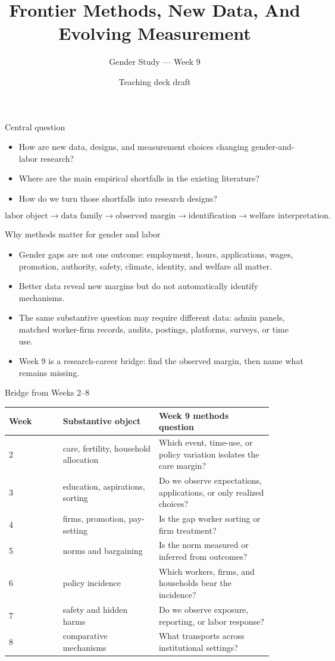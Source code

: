 \documentclass[aspectratio=169,11pt]{beamer}
\title{Frontier Methods, New Data, And Evolving Measurement}
\subtitle{Gender Study --- Week 9}
\author{Teaching deck draft}
\date{}
\begin{document}
\begin{frame}
  \titlepage
\end{frame}

\begin{frame}{Central question}
\begin{itemize}
    \item How are new data, designs, and measurement choices changing gender-and-labor research?
    \item Where are the main empirical shortfalls in the existing literature?
    \item How do we turn those shortfalls into research designs?
\end{itemize}
\vspace{0.25cm}
\[
\text{labor object} \rightarrow \text{data family} \rightarrow \text{observed margin}
\rightarrow \text{identification} \rightarrow \text{welfare interpretation}.
\]
\end{frame}

\begin{frame}{Why methods matter for gender and labor}
\begin{itemize}
    \item Gender gaps are not one outcome: employment, hours, applications, wages, promotion, authority, safety, climate, identity, and welfare all matter.
    \item Better data reveal new margins but do not automatically identify mechanisms.
    \item The same substantive question may require different data: admin panels, matched worker-firm records, audits, postings, platforms, surveys, or time use.
    \item Week 9 is a research-career bridge: find the observed margin, then name what remains missing.
\end{itemize}
\end{frame}

\begin{frame}{Bridge from Weeks 2--8}
\scriptsize
\begin{tabular}{p{0.18\linewidth} p{0.32\linewidth} p{0.38\linewidth}}
\toprule
Week & Substantive object & Week 9 methods question \\
\midrule
2 & care, fertility, household allocation & Which event, time-use, or policy variation isolates the care margin? \\
3 & education, aspirations, sorting & Do we observe expectations, applications, or only realized choices? \\
4 & firms, promotion, pay-setting & Is the gap worker sorting or firm treatment? \\
5 & norms and bargaining & Is the norm measured or inferred from outcomes? \\
6 & policy incidence & Which workers, firms, and households bear the incidence? \\
7 & safety and hidden harms & Do we observe exposure, reporting, or labor response? \\
8 & comparative mechanisms & What transports across institutional settings? \\
\bottomrule
\end{tabular}
\end{frame}
\end{document}
